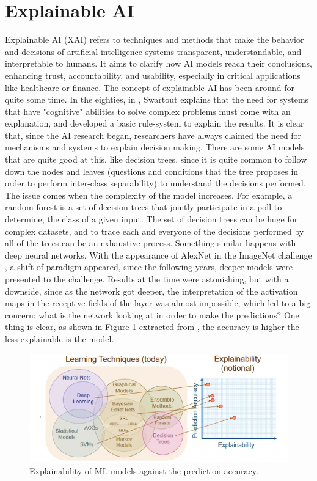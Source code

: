 \section{Explainable AI}
Explainable AI (XAI) refers to techniques and methods that make the behavior and decisions of artificial intelligence systems transparent, understandable, and interpretable to humans. It aims to clarify how AI models reach their conclusions, enhancing trust, accountability, and usability, especially in critical applications like healthcare or finance. The concept of explainable AI has been around for quite some time. In the eighties, in \cite{swartout1985explaining}, Swartout explains that the need for systems that have "cognitive" abilities to solve complex problems must come with an explanation, and developed a basic rule-system to explain the results. It is clear that, since the AI research began, researchers have always claimed the need for mechanisms and systems to explain decision making. There are some AI models that are quite good at this, like decision trees, since it is quite common to follow down the nodes and leaves (questions and conditions that the tree proposes in order to perform inter-class separability) to understand the decisions performed. The issue comes when the complexity of the model increases. For example, a random forest is a set of decision trees that jointly participate in a poll to determine, the class of a given input. The set of decision trees can be huge for complex datasets, and to trace each and everyone of the decisions performed by all of the trees can be an exhaustive process. Something similar happens with deep neural networks. With the appearance of AlexNet \cite{alexNet} in the ImageNet challenge \cite{ILSVRC15}, a shift of paradigm appeared, since the following years, deeper models were presented to the challenge. Results at the time were astonishing, but with a downside, since as the network got deeper, the interpretation of the activation maps in the receptive fields of the layer was almost impossible, which led to a big concern: what is the network looking at in order to make the predictions? One thing is clear, as shown in Figure \ref{fig:explainablechart} extracted from \cite{Turek2017}, the accuracy is higher the less explainable is the model.

\begin{figure}[!h]
	\centering
	\includegraphics[width=0.7\linewidth]{figures/explainable_chart}
	\caption{Explainability of ML models against the prediction accuracy.}
	\label{fig:explainablechart}
\end{figure}

